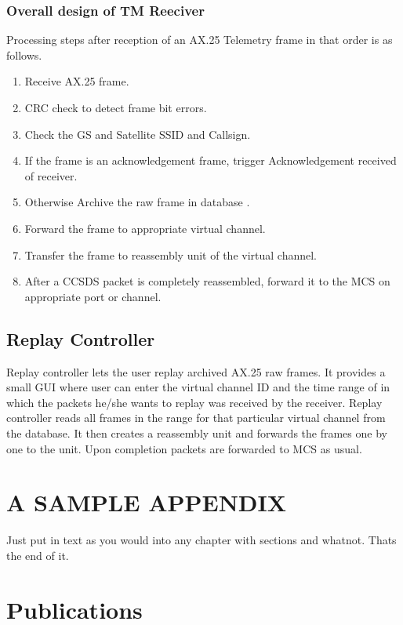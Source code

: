 \documentclass[BTech]{iitmdiss}
\begin{document}
\subsection{Overall design of TM Reeciver}
Processing steps after reception of an AX.25 Telemetry frame in that order is as follows. 
\begin{enumerate}
\item Receive AX.25 frame.
\item CRC check to detect frame bit errors.
\item Check the GS and Satellite SSID and Callsign.
\item If the frame is an acknowledgement frame, trigger Acknowledgement received of receiver.
\item Otherwise Archive the raw frame in database .
\item Forward the frame to appropriate virtual channel.
\item Transfer the frame to reassembly unit of the virtual channel.
\item After a CCSDS packet is completely reassembled, forward it to the MCS on appropriate port or channel. 
\end{enumerate}

\section{Replay Controller}
Replay controller lets the user replay archived AX.25 raw frames. It provides a small GUI where user can enter the virtual channel ID and the time range of in which the packets he/she wants to replay was received by the receiver. Replay controller reads all frames in the range for that particular virtual channel from the database. It then creates a reassembly unit and forwards the frames one by one to the unit. Upon completion packets are forwarded to MCS as usual.

 \appendix
 
 \chapter{A SAMPLE APPENDIX}
 
 Just put in text as you would into any chapter with sections and
 whatnot.  Thats the end of it.


\chapter*{Publications}
\vspace{-0.3cm}
\end{document}
